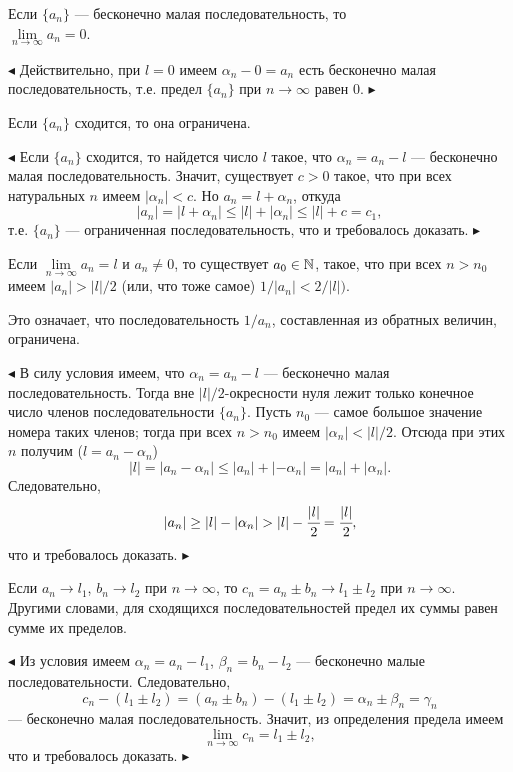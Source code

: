 \begin{approval}Если $\{a_n\}$ --- бесконечно малая последовательность, то\\ 
$\lim\limits_{n\to\infty}a_n=0$.
\end{approval}
$\blacktriangleleft$
Действительно, при $l=0$ имеем $\alpha_n-0=a_n$ есть бесконечно малая
последовательность, т.е. предел $\{a_n\}$ при $n\to\infty$ равен $0$.
$\blacktriangleright$

\begin{approval}Если $\{a_n\}$ сходится, то она ограничена.
\end{approval}
$\blacktriangleleft$
Если $\{a_n\}$ сходится, то найдется число $l$ такое, что $\alpha_n=a_n-l$
--- бесконечно малая последовательность. Значит, существует $c>0$ такое,
что при всех натуральных $n$ имеем $|\alpha_n|<c$. Но $a_n=l+\alpha_n$, откуда
$$
|a_n|=|l+\alpha_n|\le|l|+|\alpha_n|\le|l|+c=c_1,
$$
т.е. $\{a_n\}$ --- ограниченная последовательность, что и требовалось доказать.
$\blacktriangleright$

\begin{approval}Если $\lim\limits_{n\to\infty}a_n=l$  и $a_n\ne0$, то существует
$a_0\in\mathbb N$, такое, что при всех $n>n_0$ имеем $|a_n|>|l|/2$ (или, что тоже самое)
$1/|a_n|<2/|l|)$.

Это означает, что последовательность $1/a_n$, составленная из обратных величин,
ограничена.
\end{approval}

$\blacktriangleleft$
В силу условия имеем, что $\alpha_n=a_n-l$ --- бесконечно малая последовательность.
Тогда вне $|l|/2$-окресности нуля лежит только конечное число членов последовательности
$\{a_n\}$. Пусть $n_0$ --- самое большое значение номера таких членов; тогда при всех
$n>n_0$ имеем $|\alpha_n|<|l|/2$. Отсюда при этих $n$ получим ($l=a_n-\alpha_n$)
$$
|l|=|a_n-\alpha_n|\le|a_n|+|-\alpha_n|=|a_n|+|\alpha_n|.
$$
Следовательно,
$$
|a_n|\ge|l|-|\alpha_n|>|l|-\cfrac{|l|}{2}=\cfrac{|l|}{2},
$$
что и требовалось доказать.
$\blacktriangleright$

\begin{approval}Если $a_n\to l_1$, $b_n\to l_2$ при $n\to\infty$, то 
$c_n=a_n\pm b_n\to l_1\pm l_2$ при $n\to\infty$. Другими словами, 
для сходящихся последовательностей предел их суммы равен сумме их пределов.
\end{approval}
$\blacktriangleleft$
Из условия имеем $\alpha_n=a_n-l_1$, $\beta_n=b_n-l_2$ --- бесконечно малые 
последовательности. Следовательно,
$$
c_n-(l_1\pm l_2)=(a_n\pm b_n)-(l_1\pm l_2)=\alpha_n\pm \beta_n=\gamma_n
$$
--- бесконечно малая последовательность. Значит, из определения предела имеем
$$
\lim_{n\to\infty}c_n=l_1\pm l_2,
$$
что и требовалось доказать.
$\blacktriangleright$

